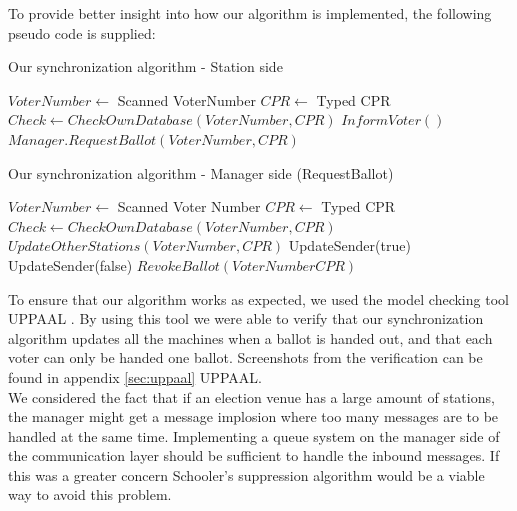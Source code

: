 \documentclass[a4paper]{report}
\begin{document}
To provide better insight into how our algorithm is implemented, the following pseudo code is supplied:
\begin{algorithm} [H]
\caption{Our synchronization algorithm - Station side}
\begin{algorithmic}[1]
\STATE $VoterNumber \leftarrow$ Scanned VoterNumber
\STATE $CPR \leftarrow$ Typed CPR
\STATE $Check \leftarrow CheckOwnDatabase(VoterNumber, CPR)$ 
\STATE $InformVoter()$ 
\ELSE
\STATE $Manager.RequestBallot(VoterNumber, CPR)$ 
\ENDIF 
\end{algorithmic}
\end{algorithm}

\begin{algorithm} [H]
\caption{Our synchronization algorithm - Manager side (RequestBallot)}
\begin{algorithmic}[1]
\STATE $VoterNumber \leftarrow$ Scanned Voter Number
\STATE $CPR \leftarrow$ Typed CPR
\STATE $Check \leftarrow CheckOwnDatabase(VoterNumber, CPR)$ 
\STATE $UpdateOtherStations(VoterNumber, CPR)$
\STATE UpdateSender(true) 
\ELSE
\STATE UpdateSender(false) 
\ENDIF
\ELSE
\STATE $RevokeBallot(VoterNumber CPR)$ 
\ENDIF
\end{algorithmic}
\end{algorithm}

To ensure that our algorithm works as expected, we used the model checking tool UPPAAL \cite{uppaal}. By using this tool we were able to verify that our synchronization algorithm updates all the machines when a ballot is handed out, and that each voter can only be handed one ballot. Screenshots from the verification can be found in appendix \ref{sec:uppaal} UPPAAL. \\

We considered the fact that if an election venue has a large amount of stations, the manager might get a message implosion where too many messages are to be handled at the same time. Implementing a queue system on the manager side of the communication layer should be sufficient to handle the inbound messages. If this was a greater concern Schooler's suppression algorithm \cite{schooler} would be a viable way to avoid this problem.
\end{document}
